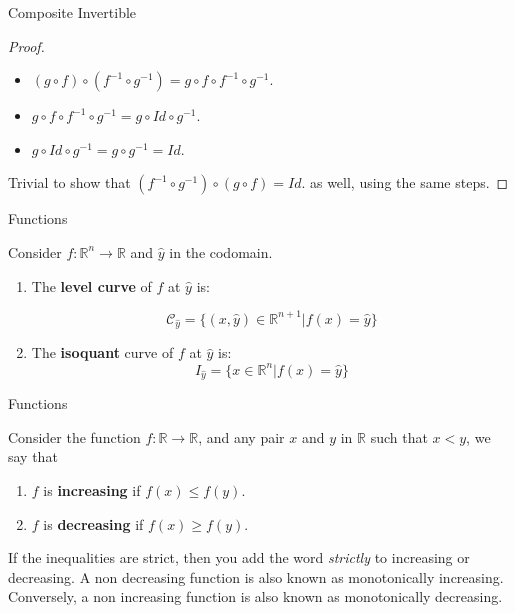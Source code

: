 \documentclass[aspectratio=169]{beamer}
\begin{document}
\begin{frame}
    
    Composite Invertible
    \begin{proof}
    
    \begin{itemize}
        
        \item $(g\circ f)\circ(f^{-1}\circ g^{-1}) = g \circ f \circ f^{-1} \circ g^{-1}$. \pause
        
        \item $g \circ f \circ f^{-1} \circ g^{-1} = g \circ Id \circ g^{-1} $. \pause
        
        \item $g \circ Id \circ g^{-1} = g \circ g^{-1} = Id. $ \pause
    \end{itemize}

    Trivial to show that $(f^{-1}\circ g^{-1})\circ (g\circ f) = Id.$ as well, using the same steps.
    
    \end{proof}
\end{frame}

\begin{frame}{Functions}
\begin{definition}
    Consider $f:\mathbb{R}^n\rightarrow \mathbb{R}$ and $\hat{y}$ in the codomain. 
    \begin{enumerate}
    \item The \textbf{level curve} of $f$ at $\hat{y}$ is:
    
    $$\mathcal{C}_{\hat{y}}=\{(x,\hat{y})\in \mathbb{R}^{n+1}|f(x)=\hat{y}\}$$
    \item The \textbf{isoquant} curve of $f$ at $\hat{y}$ is:
    $$I_{\hat{y}}=\{x\in\mathbb{R}^n|f(x)=\hat{y}\}$$
    \end{enumerate}    
\end{definition}
\end{frame}

\begin{frame}{Functions}
    \begin{definition}
        Consider the function $f:\mathbb{R}\rightarrow\mathbb{R}$, and any pair $x$ and $y$ in $\mathbb{R}$ such that $x<y$, we say that
        \begin{enumerate}
            \item $f$ is \textbf{increasing} if $f(x)\leq f(y)$.
            \item $f$ is \textbf{decreasing} if $f(x)\geq f(y)$.
        \end{enumerate}
    \end{definition}
    
    If the inequalities are strict, then you add the word \emph{strictly} to increasing or decreasing. A non decreasing function is also known as monotonically increasing. Conversely, a non increasing function is also known as monotonically decreasing.
\end{frame}
\end{document}
